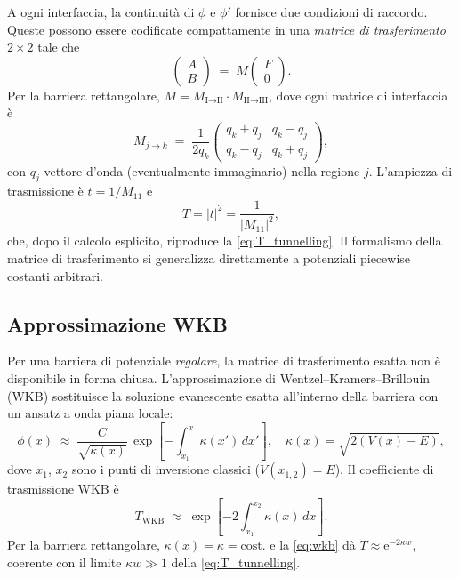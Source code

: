 \documentclass[12pt, a4paper]{article}
\newcommand{\ee}{\mathrm{e}}          %
\begin{document}
A ogni interfaccia, la continuità di $\phi$ e $\phi'$ fornisce due
condizioni di raccordo.  Queste possono essere codificate
compattamente in una \emph{matrice di trasferimento} $2\times 2$
tale che
\begin{equation}
  \begin{pmatrix} A \\ B \end{pmatrix}
  \;=\; M \begin{pmatrix} F \\ 0 \end{pmatrix}.
\end{equation}
Per la barriera rettangolare,
$M = M_{\text{I}\to\text{II}}\cdot M_{\text{II}\to\text{III}}$,
dove ogni matrice di interfaccia è
\begin{equation}
  M_{j\to k} \;=\; \frac{1}{2q_k}
  \begin{pmatrix}
    q_k + q_j & q_k - q_j \\
    q_k - q_j & q_k + q_j
  \end{pmatrix},
\end{equation}
con $q_j$ vettore d'onda (eventualmente immaginario) nella regione
$j$.  L'ampiezza di trasmissione è $t = 1/M_{11}$ e
\begin{equation}
  T = |t|^2 = \frac{1}{|M_{11}|^2},
\end{equation}
che, dopo il calcolo esplicito, riproduce la \eqref{eq:T_tunnelling}.
Il formalismo della matrice di trasferimento si generalizza
direttamente a potenziali piecewise costanti arbitrari.

\subsection{Approssimazione WKB}

Per una barriera di potenziale \emph{regolare}, la matrice di
trasferimento esatta non è disponibile in forma chiusa.
L'approssimazione di Wentzel--Kramers--Brillouin (WKB) sostituisce
la soluzione evanescente esatta all'interno della barriera con un
ansatz a onda piana locale:
\begin{equation}
  \phi(x) \;\approx\;
  \frac{C}{\sqrt{\kappa(x)}}\,\exp\!\left[-\int_{x_1}^{x}\kappa(x')\,dx'\right],
  \quad \kappa(x) = \sqrt{2(V(x)-E)},
\end{equation}
dove $x_1$, $x_2$ sono i punti di inversione classici
($V(x_{1,2}) = E$).  Il coefficiente di trasmissione WKB è
\begin{equation}
  T_\text{WKB} \;\approx\; \exp\!\left[-2\int_{x_1}^{x_2}\kappa(x)\,dx\right].
  \label{eq:wkb}
\end{equation}
Per la barriera rettangolare, $\kappa(x) = \kappa = \text{cost.}$ e
la \eqref{eq:wkb} dà $T \approx \ee^{-2\kappa w}$, coerente con il
limite $\kappa w \gg 1$ della \eqref{eq:T_tunnelling}.
\end{document}
